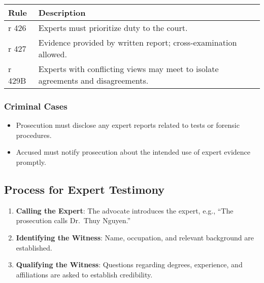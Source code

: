 \begin{longtable}[]{@{}
  >{\raggedright\arraybackslash}p{}
  >{\raggedright\arraybackslash}p{}@{}}
\toprule\noalign{}
\begin{minipage}[b]{\linewidth}\raggedright
Rule
\end{minipage} & \begin{minipage}[b]{\linewidth}\raggedright
Description
\end{minipage} \\
\midrule\noalign{}
\endhead
\bottomrule\noalign{}
\endlastfoot
r 426 & Experts must prioritize duty to the court. \\
r 427 & Evidence provided by written report; cross-examination
allowed. \\
r 429B & Experts with conflicting views may meet to isolate agreements
and disagreements. \\
\end{longtable}

\subsubsection{Criminal Cases}\label{criminal-cases-1}

\begin{itemize}
\tightlist
\item
  Prosecution must disclose any expert reports related to tests or
  forensic procedures.
\item
  Accused must notify prosecution about the intended use of expert
  evidence promptly.
\end{itemize}

\subsection{ Process for Expert
Testimony}\label{process-for-expert-testimony}

\begin{enumerate}
\def\labelenumi{\arabic{enumi}.}
\tightlist
\item
  \textbf{Calling the Expert}: The advocate introduces the expert, e.g.,
  ``The prosecution calls Dr.~Thuy Nguyen.''
\item
  \textbf{Identifying the Witness}: Name, occupation, and relevant
  background are established.
\item
  \textbf{Qualifying the Witness}: Questions regarding degrees,
  experience, and affiliations are asked to establish credibility.
\end{enumerate}

